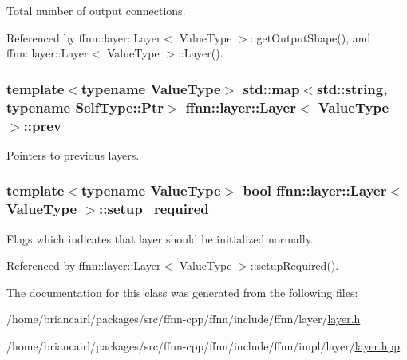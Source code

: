 Total number of output connections. 



Referenced by ffnn\-::layer\-::\-Layer$<$ Value\-Type $>$\-::get\-Output\-Shape(), and ffnn\-::layer\-::\-Layer$<$ Value\-Type $>$\-::\-Layer().

\hypertarget{classffnn_1_1layer_1_1_layer_ad9e644d000ce8595192153c6c49927b6}{
\subsubsection[{prev\-\_\-}]{\setlength{\rightskip}{0pt plus 5cm}template$<$typename Value\-Type$>$ std\-::map$<$std\-::string, typename {\bf Self\-Type\-::\-Ptr}$>$ {\bf ffnn\-::layer\-::\-Layer}$<$ Value\-Type $>$\-::prev\-\_\-\hspace{0.3cm}{\ttfamily [protected]}}}\label{classffnn_1_1layer_1_1_layer_ad9e644d000ce8595192153c6c49927b6}


Pointers to previous layers. 

\hypertarget{classffnn_1_1layer_1_1_layer_a1a366d73e2b1ead280a6956c85ea56cb}{
\subsubsection[{setup\-\_\-required\-\_\-}]{\setlength{\rightskip}{0pt plus 5cm}template$<$typename Value\-Type$>$ bool {\bf ffnn\-::layer\-::\-Layer}$<$ Value\-Type $>$\-::setup\-\_\-required\-\_\-\hspace{0.3cm}{\ttfamily [protected]}}}\label{classffnn_1_1layer_1_1_layer_a1a366d73e2b1ead280a6956c85ea56cb}


Flags which indicates that layer should be initialized normally. 



Referenced by ffnn\-::layer\-::\-Layer$<$ Value\-Type $>$\-::setup\-Required().



The documentation for this class was generated from the following files\-:\begin{DoxyCompactItemize}
\item 
/home/briancairl/packages/src/ffnn-\/cpp/ffnn/include/ffnn/layer/\hyperlink{layer_8h}{layer.\-h}\item 
/home/briancairl/packages/src/ffnn-\/cpp/ffnn/include/ffnn/impl/layer/\hyperlink{layer_8hpp}{layer.\-hpp}\end{DoxyCompactItemize}
